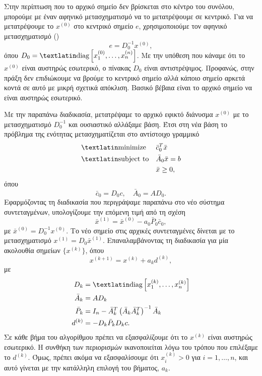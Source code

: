 Στην περίπτωση που το αρχικό σημείο δεν βρίσκεται στο κέντρο του συνόλου,
μπορούμε με έναν αφηνικό μετασχηματισμό να το μετατρέψουμε σε κεντρικό. Για να
μετατρέψουμε το \( x^{(0)} \) στο κεντρικό σημείο \(e\), χρησιμοποιούμε τον
αφηνικό μετασχηματισμό ()
\begin{equation*}
    e = D_0^{-1}x^{(0)},
\end{equation*}
όπου \( D_0 = \text{\tl{diag}}\left[ x_1^{(0)}, \dots, x_n^{(n)} \right]\). Με την
υπόθεση που κάναμε ότι το \( x^{(0)} \) είναι αυστηρώς εσωτερικό, ο πίνακας
\(D_0 \) είναι αντιστρέψιμος. Προφανώς, στην πράξη δεν επιδιώκουμε να βρούμε το
κεντρικό σημείο αλλά κάποιο σημείο αρκετά κοντά σε αυτό με μικρή σχετικά
απόκλιση. Βασικό βέβαια είναι το αρχικό σημείο να είναι αυστηρώς εσωτερικό.

Με την παραπάνω διαδικασία, μετατρέψαμε το αρχικό εφικτό διάνυσμα
\( x^{(0)} \) με το μετασχηματισμό \( D_0^{-1} \) και ουσιαστικό αλλάξαμε βάση.
Έτσι στη νέα βάση το πρόβλημα της ενότητας μετασχηματίζεται στο
αντίστοιχο γραμμικό
\begin{equation*}
    \begin{aligned}
        & {\text{\tl{minimize}}}
        & & \bar{c}_0^T \bar{x} \\
        & \text{\tl{subject to}}
        & & \bar{A}_0 \bar{x} = b \\
        &&& \bar{x} \ge 0,
    \end{aligned}
\end{equation*}
όπου
\begin{equation*}
    \bar{c}_0 = D_0c, \quad \bar{A}_0 = AD_0.
\end{equation*}
Εφαρμόζοντας τη διαδικασία που περιγράψαμε παραπάνω στο νέο σύστημα
συντεταγμένων, υπολογίζουμε την επόμενη τιμή από τη σχέση
\begin{equation*}
    \bar{x}^{(1)} = \bar{x}^{(0)} - a_0\bar{P}_0\bar{c}_0,
\end{equation*}
με \( \bar{x}^{(0)} = D_0^{-1}x^{(0)} \). Το νέο σημείο στις αρχικές
συντεταγμένες δίνεται με το μετασχηματισμό \( x^{(1)} = D_0 \bar{x}^{(1)} \).
Επαναλαμβάνοντας τη διαδικασία για μία ακολουθία σημείων \( \{ x^{(k)} \} \), όπου
\begin{equation*}
    x^{(k+1)} = x^{(k)} + a_kd^{(k)},
\end{equation*}
με
\begin{align*}
    D_k &= \text{\tl{diag}}\left[ x^{(k)}_1, \dots, x_n^{(k)} \right] \\
    \bar{A}_k &= AD_k \\
    \bar{P}_k &= I_n - \bar{A}^T_k \left(\bar{A}_k\bar{A}_k^T
    \right)^{-1}\bar{A}_k \\
    d^{(k)} &= -D_k\bar{P}_kD_kc.
\end{align*}
Σε κάθε βήμα του αλγορίθμου πρέπει να εξασφαλίζουμε ότι το \( x^{(k)} \) είναι
αυστηρώς εσωτερικό. Η συνθήκη των περιορισμών ικανοποιείται λόγω του τρόπου που
επιλέξαμε το \( d^{(k)} \). Όμως, πρέπει ακόμα να εξασφαλίσουμε ότι
\(x_i^{(k)} > 0 \) για \( i = 1, \dots, n \), και αυτό γίνεται με την κατάλληλη
επιλογή του βήματος, \(a_k\).

